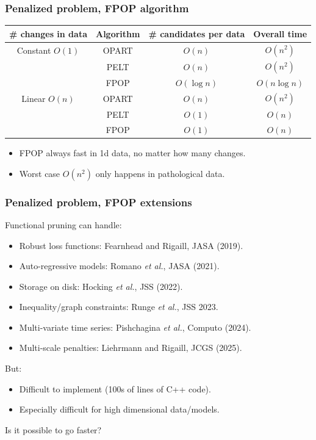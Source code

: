 \documentclass{beamer}
\newcommand{\algo}[1]{\textcolor{#1}{#1}}
\newcommand{\RR}{\mathbb R}
\begin{document}
\begin{frame}
  \frametitle{Penalized problem, FPOP algorithm}
\begin{tabular}{cccc}
  \# changes in data & Algorithm & \# candidates per data & Overall time \\
  \hline
  Constant $O(1)$ & \algo{OPART} &  $O(n)$ & $O(n^2)$\\
                     & \algo{PELT} &  $O(n)$ & $O(n^2)$\\
                     & \algo{FPOP} &  \textcolor{FPOP}{$O(\log n)$} & \textcolor{FPOP}{$O(n\log n)$}\\
  \hline
  Linear $O(n)$ & \algo{OPART} &  $O(n)$ & $O(n^2)$ \\
   & \algo{PELT} &  \textcolor{PELT}{$O(1)$} & \textcolor{PELT}{$O(n)$} \\
   & \algo{FPOP} &  \textcolor{FPOP}{$O(1)$} & \textcolor{FPOP}{$O(n)$} \\
\end{tabular}

\begin{itemize}
\item FPOP always fast in 1d data, no matter how many changes.
\item Worst case $O(n^2)$ only happens in pathological data.
\end{itemize}
\end{frame}

\begin{frame}
  \frametitle{Penalized problem, FPOP extensions}
Functional pruning can handle:
\begin{itemize}
\item Robust loss functions: Fearnhead and Rigaill,
  JASA (2019).
\item Auto-regressive models: Romano \emph{et al.},
  JASA (2021).
\item Storage on disk: Hocking \emph{et al.}, JSS (2022).
\item Inequality/graph constraints: Runge \emph{et al.}, JSS 2023.
\item Multi-variate time series: Pishchagina \emph{et al.},
  Computo (2024).
\item Multi-scale penalties: Liehrmann and Rigaill, JCGS (2025).
\end{itemize}
But:
\begin{itemize}
\item Difficult to implement (100s of lines of C++ code).
\item Especially difficult for high dimensional data/models.
\end{itemize}
Is it possible to go faster?
\end{frame}
\end{document}
